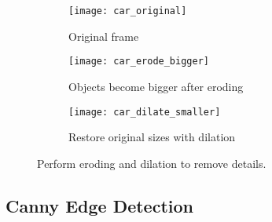 \begin{figure}[ht]
\centering
\begin{subfigure}{.5\textwidth}
  \centering
  \texttt{[image: car\_original]}
  \caption{Original frame\label{zebra_orig}}
\end{subfigure}%
\begin{subfigure}{.5\textwidth}
  \centering
  \texttt{[image: car\_erode\_bigger]}
  \caption{Objects become bigger after eroding\label{zebrawitcanny}}
\end{subfigure}
\begin{subfigure}{.5\textwidth}
  \centering
  \texttt{[image: car\_dilate\_smaller]}
  \caption{Restore original sizes with dilation\label{zebrawitcanny}}
\end{subfigure}
\caption{Perform eroding and dilation to remove details.}
\end{figure}


\subsection{Canny Edge Detection}